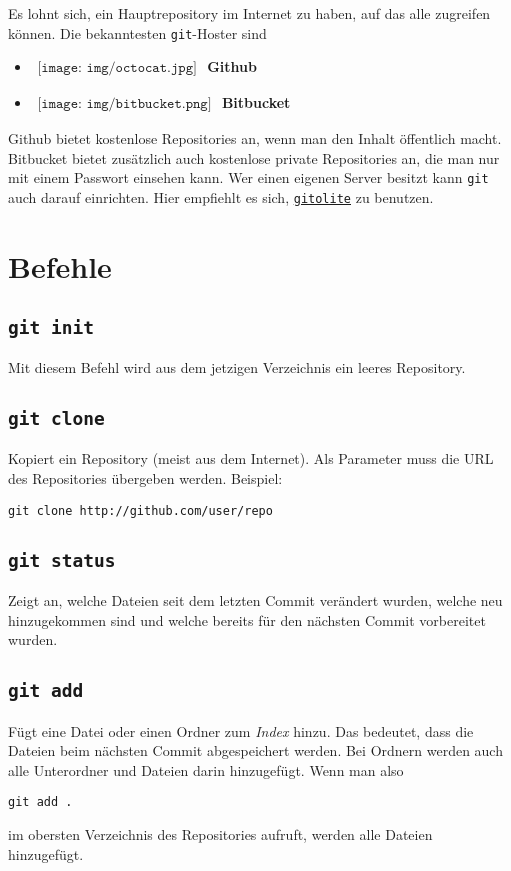 Es lohnt sich, ein Hauptrepository im Internet zu haben, auf das alle zugreifen können.
Die bekanntesten \texttt{git}-Hoster sind 
\begin{itemize}
  \item $
    \begin{array}{l}
      \texttt{[image: img/octocat.jpg]}
    \end{array} $ \textbf{Github}

  \item $
    \begin{array}{l}
      \texttt{[image: img/bitbucket.png]}
    \end{array} $ \textbf{Bitbucket}
\end{itemize}
Github bietet kostenlose Repositories an, wenn man den Inhalt öffentlich macht.
Bitbucket bietet zusätzlich auch kostenlose private Repositories an, die man nur mit einem Passwort einsehen kann.
Wer einen eigenen Server besitzt kann \texttt{git} auch darauf einrichten.
Hier empfiehlt es sich, \href{https://github.com/sitaramc/gitolite}{\texttt{gitolite}} zu benutzen.

\section{Befehle}

\subsection{\texttt{git init}}
Mit diesem Befehl wird aus dem jetzigen Verzeichnis ein leeres Repository.

\subsection{\texttt{git clone}}
Kopiert ein Repository (meist aus dem Internet).
Als Parameter muss die URL des Repositories übergeben werden.
Beispiel:
\begin{verbatim}
git clone http://github.com/user/repo
\end{verbatim}

\subsection{\texttt{git status}}
Zeigt an, welche Dateien seit dem letzten Commit verändert wurden, welche neu hinzugekommen sind und welche bereits für den nächsten Commit vorbereitet wurden.

\subsection{\texttt{git add}}
Fügt eine Datei oder einen Ordner zum \textit{Index} hinzu. Das bedeutet, dass die Dateien beim nächsten Commit abgespeichert werden.
Bei Ordnern werden auch alle Unterordner und Dateien darin hinzugefügt.
Wenn man also
\begin{verbatim}
git add .
\end{verbatim}
im obersten Verzeichnis des Repositories aufruft, werden alle Dateien hinzugefügt.


